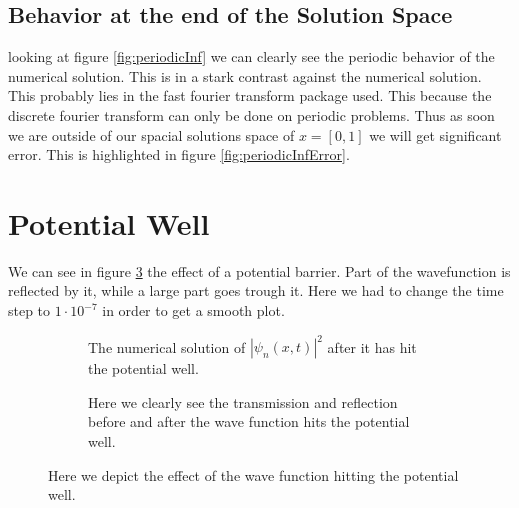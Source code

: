 \documentclass[11pt]{article}
\newlength\figureheight
\newlength\figurewidth
\newif\iftikz
\begin{document}
\subsection{Behavior at the end of the Solution Space}
looking at figure \ref{fig:periodicInf} we can clearly see the periodic behavior of the numerical solution. This is in a stark contrast against the numerical solution. This probably lies in the fast fourier transform package used. This because the discrete fourier transform can only be done on periodic problems. Thus as soon we are outside of our spacial solutions space of $x=[0,1]$ we will get significant error. This is highlighted in figure \ref{fig:periodicInfError}.
\iftikz
\begin{figure}[H]
	\centering
	\begin{subfigure}{.9\linewidth}
		\setlength\figureheight{.5\linewidth} 
		\setlength\figurewidth{.9\linewidth}
		
		\caption{The numerical solution ($\psi_n$) plotted against the analytical solution ($\psi_a$).}
		\label{fig:periodicInfPlot}
	\end{subfigure}
	\begin{subfigure}{.9\linewidth}
		\setlength\figureheight{.5\linewidth} 
		\setlength\figurewidth{.9\linewidth}
		
		\caption{The error is defined as the difference between the analytical solution and numerical solution.}
		\label{fig:periodicInfError}
	\end{subfigure}
	\label{fig:smallError}
	\caption{The numerical and analytical solution as it passes its solution space of $x=[0,1]$. One can clearly see in figure \ref{fig:periodicInfPlot} that the numerical solution is periodic. The error caused by this is highlighted in figure \ref{fig:periodicInfError}}
\end{figure}
\fi
\section{Potential Well}
We can see in figure \ref{fig:potWell} the effect of a potential barrier. Part of the wavefunction is reflected by it, while a large part goes trough it. Here we had to change the time step to $1\cdot10^{-7}$ in order to get a smooth plot. 
\begin{figure}[H]
	\centering
	\begin{subfigure}{.9\linewidth}
		\setlength{} 
		\setlength{}
		
		\caption{The numerical solution of $|\psi_n(x,t)|^2$ after it has hit the potential well.}
		\label{fig:potWellfPlot}
	\end{subfigure}
	\begin{subfigure}{.9\linewidth}
		\setlength{} 
		\setlength{}
		
		\caption{Here we clearly see the transmission and reflection before and after the wave function hits the potential well.}
		\label{fig:potWellTR}
	\end{subfigure}
	\label{fig:potWell}
	\caption{Here we depict the effect of the wave function hitting the potential well.}
\end{figure}
\end{document}
